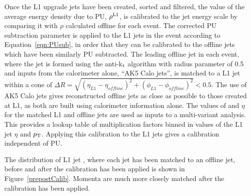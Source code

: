 Once the \ac{L1} upgrade jets have been created, sorted and filtered, the value of the average energy density due to \ac{PU}, $\rho^{\rm L1}$, 
is calibrated to the jet energy scale by comparing it with $\rho$ calculated offline for each event.
The corrected \ac{PU} subtraction parameter is applied to the \ac{L1} jets in the event according to Equation~\ref{eqn:PUsub}, in order that they 
can be calibrated to the offline jets which have been similarly \ac{PU} subtracted.
The leading offline jet in each event, where the jet is formed using the anti-k$_{\rm t}$ algorithm with radius parameter of 0.5 and inputs from the calorimeter alone, ``AK5 Calo jets'', is matched to a L1 jet within a cone of 
$\Delta R = \sqrt{ (\eta_{L1} - \eta_{offline})^2 + (\phi_{L1} - \phi_{offline})^2} < 0.5$.
The use of AK5 Calo jets gives reconstructed offline jets as close as possible to those created at \ac{L1}, as both are built using calorimeter information alone.
The values of \pt and $\eta$ for the matched \ac{L1} and offline jets are used as inputs to a multi-variant analysis.  
This provides a lookup table of multiplication factors binned in values of the L1 jet $\eta$ and $p_{\text{T}}$. 
Applying this calibration to the \ac{L1} jets gives a calibration independent of PU. 

The distribution of L1 jet \pt, where each jet has been matched to an offline jet, before and after the calibration has been applied is shown in Figure~\ref{prepostCalib}. 
Momenta are much more closely matched after the calibration has been applied.

